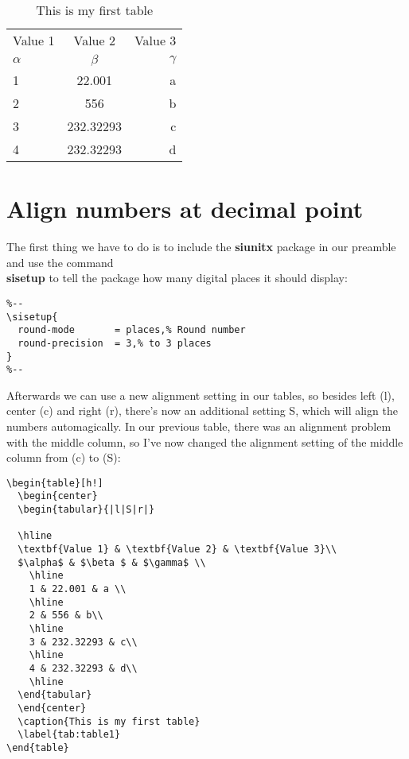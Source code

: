 \documentclass[%
  parskip=full,%
  twoside=false%
]{book}
\begin{document}
\begin{table}[h!]
  \begin{center}
  \begin{tabular}{|l|c|r|} %
  \hline
    Value 1 & Value 2 & Value 3\\
    $\alpha$ & $\beta $ & $\gamma$ \\
    \hline
    1 & 22.001 & a \\
    \hline
    2 & 556 & b\\
    \hline
    3 & 232.32293 & c\\
    \hline
    4 & 232.32293 & d\\
    \hline
  \end{tabular}
  \end{center}
  \caption{This is my first table}
  \label{tab:table0}
\end{table}

\section{Align numbers at decimal point}

The first thing we have to do is to include the \textbf{siunitx} package in our preamble and use the command \textbf{\\sisetup} to tell the package how many digital places it should display:

\begin{lstlisting}
%--
\sisetup{
  round-mode       = places,% Round number
  round-precision  = 3,% to 3 places
}
%--
\end{lstlisting}

Afterwards we can use a new alignment setting in our tables, so besides left (l), center (c) and right (r), there's now an additional setting S, which will align the numbers automagically. In our previous table, there was an alignment problem with the middle column, so I've now changed the alignment setting of the middle column from (c) to (S):

\begin{lstlisting}
\begin{table}[h!]
  \begin{center}
  \begin{tabular}{|l|S|r|}

  \hline
  \textbf{Value 1} & \textbf{Value 2} & \textbf{Value 3}\\
  $\alpha$ & $\beta $ & $\gamma$ \\
    \hline
    1 & 22.001 & a \\
    \hline
    2 & 556 & b\\
    \hline
    3 & 232.32293 & c\\
    \hline
    4 & 232.32293 & d\\
    \hline
  \end{tabular}
  \end{center}
  \caption{This is my first table}
  \label{tab:table1}
\end{table}
\end{lstlisting}
\end{document}
